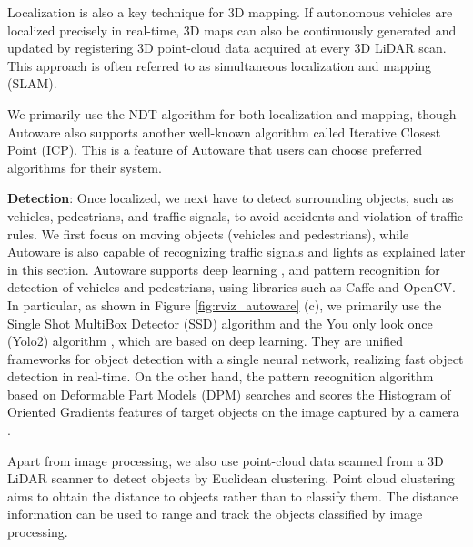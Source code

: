 Localization is also a key technique for 3D mapping.
If autonomous vehicles are localized precisely in real-time, 3D maps can
also be continuously generated and updated by registering 3D point-cloud
data acquired at every 3D LiDAR scan.
This approach is often referred to as simultaneous localization and
mapping (SLAM).

We primarily use the NDT algorithm for both localization and mapping,
though Autoware also supports another well-known algorithm called
Iterative Closest Point (ICP).
This is a feature of Autoware that users can choose preferred algorithms
for their system.

  
\textbf{Detection}:
Once localized, we next have to detect surrounding objects, such as
vehicles, pedestrians, and traffic signals, to avoid accidents and
violation of traffic rules.
We first focus on moving objects (vehicles and pedestrians), while
Autoware is also capable of recognizing traffic signals and lights as
explained later in this section. 
Autoware supports deep learning \cite{liu2016ssd},
\cite{DBLP:journals/corr/RedmonF16} and pattern recognition
\cite{felzenszwalb2010object} for detection of vehicles and pedestrians,
using libraries such as Caffe and OpenCV. 
In particular, as shown in Figure \ref{fig:rviz_autoware} (c), we primarily use the Single Shot MultiBox Detector (SSD)
algorithm \cite{liu2016ssd} and the You only look once (Yolo2) algorithm
\cite{DBLP:journals/corr/RedmonF16}, which are based on deep learning.
They are unified frameworks for object detection with a single neural
network, realizing fast object detection in real-time.
On the other hand, the pattern recognition algorithm based on Deformable
Part Models (DPM) \cite{felzenszwalb2010object} searches and scores the
Histogram of Oriented Gradients features of target objects on the image
captured by a camera \cite{dalal2005histograms}.

Apart from image processing, we also use point-cloud data scanned from a
3D LiDAR scanner to detect objects by Euclidean clustering. 
Point cloud clustering aims to obtain the distance to objects rather
than to classify them.
The distance information can be used to range and track the objects
classified by image processing.

